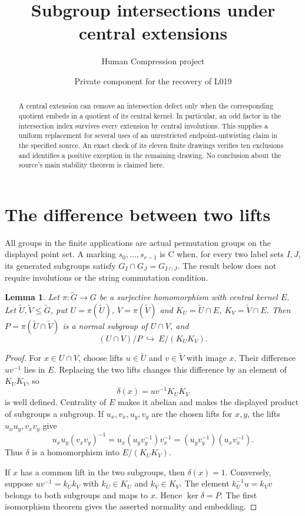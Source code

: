 \documentclass[a4paper,11pt]{article}
\title{Subgroup intersections under central extensions}
\author{Human Compression project}
\date{Private component for the recovery of L019}
\newtheorem{lemma}[theorem]{Lemma}
\begin{document}
\maketitle
\begin{abstract}
A central extension can remove an intersection defect only when the
corresponding quotient embeds in a quotient of its central kernel. In
particular, an odd factor in the intersection index survives every extension
by central involutions. This supplies a uniform replacement for several
uses of an unrestricted endpoint-untwisting claim in the specified source.
An exact check of its eleven finite drawings verifies ten exclusions and
identifies a positive exception in the remaining drawing. No conclusion
about the source's main stability theorem is claimed here.
\end{abstract}

\section{The difference between two lifts}
All groups in the finite applications are actual permutation groups on the
displayed point set. A marking $s_0,\ldots,s_{r-1}$ is C when, for every
two label sets $I,J$, its generated subgroups satisfy
$G_I\cap G_J=G_{I\cap J}$. The result below does not require involutions
or the string commutation condition.

\begin{lemma}\label{difference}
Let $\pi:\widetilde G\to G$ be a surjective homomorphism with central
kernel $E$. Let $\widetilde U,\widetilde V\leq\widetilde G$, put
$U=\pi(\widetilde U)$, $V=\pi(\widetilde V)$ and
$K_U=\widetilde U\cap E$, $K_V=\widetilde V\cap E$. Then
$P=\pi(\widetilde U\cap\widetilde V)$ is a normal subgroup of
$U\cap V$, and
\[
             (U\cap V)/P\ \hookrightarrow\ E/(K_UK_V).
\]
\end{lemma}
\begin{proof}
For $x\in U\cap V$, choose lifts $u\in\widetilde U$ and
$v\in\widetilde V$ with image $x$. Their difference $uv^{-1}$ lies
in $E$. Replacing the two lifts changes this difference by an element
of $K_UK_V$, so
\[
 \delta(x)=uv^{-1}K_UK_V
\]
is well defined. Centrality of $E$ makes it abelian and makes the displayed
product of subgroups a subgroup. If $u_x,v_x,u_y,v_y$ are the chosen
lifts for $x,y$, the lifts $u_xu_y,v_xv_y$ give
\[
 u_xu_y(v_xv_y)^{-1}
 =u_x(u_yv_y^{-1})v_x^{-1}
 =(u_yv_y^{-1})(u_xv_x^{-1}).
\]
Thus $\delta$ is a homomorphism into $E/(K_UK_V)$.

If $x$ has a common lift in the two subgroups, then $\delta(x)=1$.
Conversely, suppose $uv^{-1}=k_Uk_V$ with $k_U\in K_U$ and
$k_V\in K_V$. The element $k_U^{-1}u=k_Vv$ belongs to both subgroups
and maps to $x$. Hence $\ker\delta=P$. The first isomorphism theorem
gives the asserted normality and embedding.
\end{proof}
\end{document}
